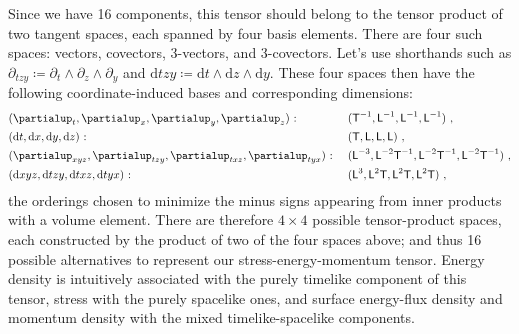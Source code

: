 \documentclass[\ifafour a4paper,12pt,\else a5paper,10pt,\fi%
onecolumn,oneside,article,%
british%
]{memoir}
\theoremstyle{remark}
\theoremstyle{innote}
\newcommand*{\de}{\partialup}%
\newcommand*{\di}{\mathrm{d}}%
\newcommand*{\defd}{\coloneqq}
\renewcommand*{\|}[1][]{\nonscript\,#1\vert\nonscript\;\mathopen{}}
\newcommand*{\Le}{\textsf{L}}
\newcommand*{\Ti}{\textsf{T}}
\begin{document}
Since we have 16 components, this tensor should belong to the tensor
product of two tangent spaces, each spanned by four basis elements. There
are four such spaces: vectors, covectors, 3-vectors, and 3-covectors. Let's
use shorthands such as
$\de_{tzy} \defd \de_{t} \land \de_{z} \land \de_{y}$ and
$\di tzy \defd \di t \land \di z \land \di y$. These four spaces then have
the following coordinate-induced bases and corresponding dimensions:
\begin{subequations}\label{eq:bases}
  \begin{align}
    \label{eq:base_vec}
    &  (\de_{t}, \de_{x}, \de_{y}, \de_{z})\ \text{:}
    &&\text{\small }\ (\Ti^{-1}, \Le^{-1}, \Le^{-1}, \Le^{-1}) \ ,
    \\
    \label{eq:base_covec}
    &  (\di t, \di x, \di y, \di z) \ \text{:}
    &&\text{\small }\ (\Ti, \Le, \Le, \Le) \ ,
    \\
    \label{eq:base_trivec}
    &  (\de_{xyz}, \de_{tzy}, \de_{txz}, \de_{tyx})\ \text{:}
    &&\text{\small }\  (\Le^{-3}, \Le^{-2}\Ti^{-1}, \Le^{-2}\Ti^{-1}, \Le^{-2}\Ti^{-1}) \ ,
    \\
    \label{eq:base_tricovec}
    &  (\di xyz, \di tzy, \di txz, \di tyx)\ \text{:}
    &&\text{\small }\  (\Le^{3}, \Le^{2}\Ti, \Le^{2}\Ti, \Le^{2}\Ti) \ ,
  \end{align}
\end{subequations}
the orderings chosen to minimize the minus signs appearing from inner
products with a volume element. There are therefore $4 \times 4$ possible
tensor-product spaces, each constructed by the product of two of the four
spaces above; %
and thus 16 possible alternatives to represent our stress-energy-momentum
tensor. Energy density is intuitively associated with the purely timelike
component of this tensor, stress with the purely spacelike ones, and
surface energy-flux density and momentum density with the mixed
timelike-spacelike components.
\end{document}
